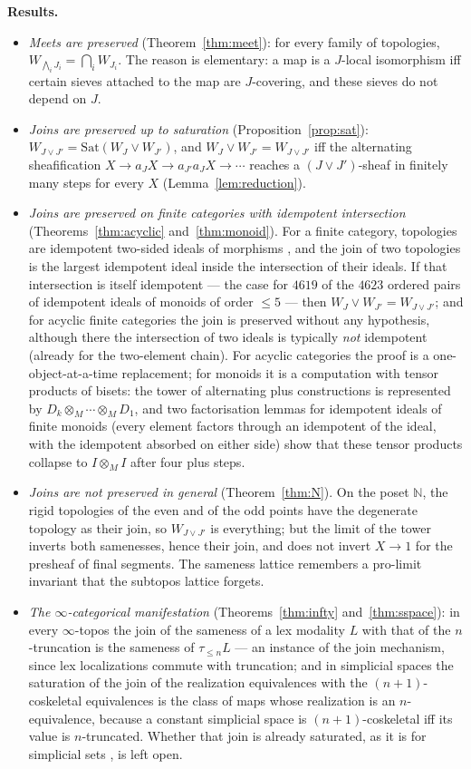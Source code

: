 \documentclass[11pt]{amsart}
\theoremstyle{definition}
\newcommand{\Sat}{\mathrm{Sat}}
\begin{document}
\medskip\noindent\textbf{Results.}
\begin{itemize}
\item[(A)] \emph{Meets are preserved} (Theorem~\ref{thm:meet}): for every family
of topologies, $W_{\bigwedge_iJ_i}=\bigcap_iW_{J_i}$. The reason is elementary:
a map is a $J$-local isomorphism iff certain sieves attached to the map are
$J$-covering, and these sieves do not depend on $J$.
\item[(B)] \emph{Joins are preserved up to saturation}
(Proposition~\ref{prop:sat}): $W_{J\vee J'}=\Sat(W_J\vee W_{J'})$, and
$W_J\vee W_{J'}=W_{J\vee J'}$ iff the alternating sheafification
$X\to a_JX\to a_{J'}a_JX\to\cdots$ reaches a $(J\vee J')$-sheaf in finitely
many steps for every $X$ (Lemma~\ref{lem:reduction}).
\item[(C)] \emph{Joins are preserved on finite categories with idempotent
intersection} (Theorems~\ref{thm:acyclic} and~\ref{thm:monoid}). For a finite
category, topologies are idempotent two-sided ideals of morphisms
\cite[Thm.~5.1]{Postnikov}, and the join of two topologies is the largest
idempotent ideal inside the intersection of their ideals. If that intersection
is itself idempotent --- the case for $4619$ of the $4623$ ordered pairs of
idempotent ideals of monoids of order $\le5$ --- then $W_J\vee W_{J'}=W_{J\vee J'}$;
and for acyclic finite categories the join is preserved without any
hypothesis, although there the intersection of two ideals is typically
\emph{not} idempotent (already for the two-element chain). For acyclic
categories the proof is a one-object-at-a-time replacement; for monoids it is
a computation with
tensor products of bisets: the tower of alternating plus constructions is represented by
$D_k\otimes_M\cdots\otimes_MD_1$, and two factorisation lemmas for idempotent
ideals of finite monoids (every element factors through an idempotent of the
ideal, with the idempotent absorbed on either side) show that these tensor
products collapse to $I\otimes_MI$ after four plus steps.
\item[(D)] \emph{Joins are not preserved in general} (Theorem~\ref{thm:N}). On
the poset $\mathbb N$, the rigid topologies of the even and of the odd points
have the degenerate topology as their join, so $W_{J\vee J'}$ is everything;
but the limit of the tower inverts both samenesses, hence their join, and does
not invert $X\to1$ for the presheaf of final segments. The sameness lattice
remembers a pro-limit invariant that the subtopos lattice forgets.
\item[(E)] \emph{The $\infty$-categorical manifestation}
(Theorems~\ref{thm:infty} and~\ref{thm:sspace}): in every $\infty$-topos the
join of the sameness of a lex modality $L$ with that of the $n$-truncation is
the sameness of $\tau_{\le n}L$ --- an instance of the join mechanism, since
lex localizations commute with truncation; and in simplicial spaces the
saturation of the join of the realization equivalences with the
$(n{+}1)$-coskeletal equivalences is the class of maps whose realization is an
$n$-equivalence, because a constant simplicial space is $(n{+}1)$-coskeletal
iff its value is $n$-truncated. Whether that join is already saturated, as it
is for simplicial sets \cite{Postnikov}, is left open.
\end{itemize}
\end{document}

